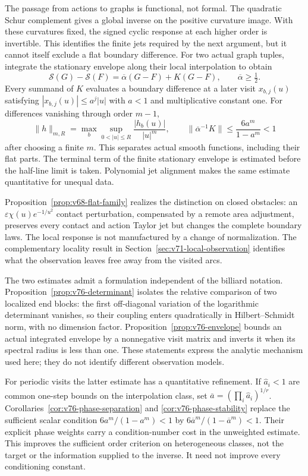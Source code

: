 The passage from actions to graphs is functional, not formal.
The quadratic Schur complement gives a global inverse on the positive
curvature image.  With these curvatures fixed, the signed cyclic
response at each higher order is invertible.  This identifies the finite
jets required by the next argument, but it cannot itself exclude a flat
boundary difference.  For two actual graph tuples, integrate the
stationary envelope along their local interpolation to obtain
\begin{equation}\label{eq:v75-envelope}
 \mathcal S(G)-\mathcal S(F)=\overline\alpha(G-F)+K(G-F),
 \qquad \overline\alpha\ge\tfrac12.
\end{equation}
Every summand of $K$ evaluates a boundary difference at a later visit
$x_{b,j}(u)$ satisfying $|x_{b,j}(u)|\le a^j|u|$ with $a<1$ and
multiplicative constant one.  For differences vanishing through order
$m-1$,
\[
 \|h\|_{m,R}=\max_b\sup_{0<|u|\le R}\frac{|h_b(u)|}{|u|^m},
 \qquad
 \|\overline\alpha^{-1}K\|\le\frac{6a^m}{1-a^m}<1
\]
after choosing a finite $m$.  This separates actual smooth functions,
including their flat parts.  The terminal term of the finite stationary
envelope is estimated before the half-line limit is taken.  Polynomial
jet alignment makes the same estimate quantitative for unequal data.

Proposition~\ref{prop:v68-flat-family} realizes the distinction on
closed obstacles: an $\varepsilon\chi(u)e^{-1/u^2}$ contact
perturbation, compensated by a remote area adjustment, preserves every
contact and action Taylor jet but changes the complete boundary laws.
The local response is not manufactured by a change of normalization.
The complementary locality result in Section~\ref{sec:v71-local-observation}
identifies what the observation leaves free away from the visited arcs.

The two estimates admit a formulation independent of the billiard
notation.  Proposition~\ref{prop:v76-determinant} isolates the relative
comparison of two localized end blocks: the first off-diagonal variation
of the logarithmic determinant vanishes, so their coupling enters
quadratically in Hilbert--Schmidt norm, with no dimension factor.
Proposition~\ref{prop:v76-envelope} bounds an actual integrated envelope
by a nonnegative visit matrix and inverts it when its spectral radius is
less than one.  These statements express the analytic mechanism used
here; they do not identify different observation models.

For periodic visits the latter estimate has a quantitative refinement.
If $\widehat a_i<1$ are common one-step bounds on the interpolation
class, set $\overline a=(\prod_i\widehat a_i)^{1/r}$.
Corollaries~\ref{cor:v76-phase-separation} and
\ref{cor:v76-phase-stability} replace the sufficient scalar condition
$6a^m/(1-a^m)<1$ by $6\overline a^m/(1-\overline a^m)<1$.
Their explicit phase weights carry a condition-number cost in the
unweighted estimate.  This improves the sufficient order criterion on
heterogeneous classes, not the target or the information supplied to
the inverse.  It need not improve every conditioning constant.

